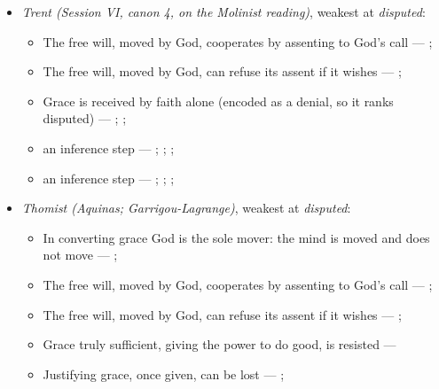 \documentclass[11pt]{article}
\begin{document}
\begin{itemize}
\item \emph{Trent (Session VI, canon 4, on the Molinist reading)}, weakest at \emph{disputed}:
\begin{itemize}
\item The free will, moved by God, cooperates by assenting to God’s call --- \cite[Trent, Session VI (1547), canon 4]{tanner-decrees-1990}; \cite[45]{waterworth-trent-1848}
\item The free will, moved by God, can refuse its assent if it wishes --- \cite[Trent, Session VI (1547), canon 4]{tanner-decrees-1990}; \cite[45]{waterworth-trent-1848}
\item Grace is received by faith alone (encoded as a denial, so it ranks disputed) --- \cite[Augsburg Confession IV.1–3]{concordia-triglotta-1921}; \cite[Sermon 1, III.1]{wesley-sermons-1872}; \cite[Trent, Session VI (1547), canon 9]{tanner-decrees-1990}
\item an inference step --- \cite[I-II q.111 a.2]{aquinas-summa-1920}; \cite[Canons of Dort, III/IV, art. 12]{schaff-creeds-christendom-3-1977}; \cite[Trent, Session VI (1547), canon 4]{tanner-decrees-1990}; \cite[45]{waterworth-trent-1848}
\item an inference step --- \cite[I-II q.10 a.4 ad 3]{aquinas-summa-1920}; \cite[I-II q.112 a.3]{aquinas-summa-1920}; \cite[Trent, Session VI (1547), canon 4]{tanner-decrees-1990}; \cite[45]{waterworth-trent-1848}
\end{itemize}
\item \emph{Thomist (Aquinas; Garrigou-Lagrange)}, weakest at \emph{disputed}:
\begin{itemize}
\item In converting grace God is the sole mover: the mind is moved and does not move --- \cite[I-II q.111 a.2]{aquinas-summa-1920}; \cite[ch. IV]{garrigou-lagrange-grace-1952}
\item The free will, moved by God, cooperates by assenting to God’s call --- \cite[Trent, Session VI (1547), canon 4]{tanner-decrees-1990}; \cite[45]{waterworth-trent-1848}
\item The free will, moved by God, can refuse its assent if it wishes --- \cite[Trent, Session VI (1547), canon 4]{tanner-decrees-1990}; \cite[45]{waterworth-trent-1848}
\item Grace truly sufficient, giving the power to do good, is resisted --- \cite[ch. VI]{garrigou-lagrange-grace-1952}
\item Justifying grace, once given, can be lost --- \cite[II-II q.24 a.11]{aquinas-summa-1920}; \cite[Trent, Session VI (1547), canon 23]{tanner-decrees-1990}

\end{itemize}
\end{itemize}
\end{document}
